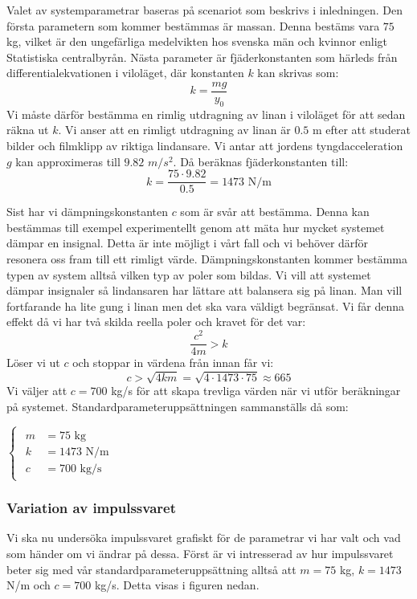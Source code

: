Valet av systemparametrar baseras på scenariot som beskrivs i inledningen. Den första parametern som kommer bestämmas är massan. Denna bestäms vara $75$ kg,  vilket är den ungefärliga medelvikten hos svenska män och kvinnor enligt Statistiska centralbyrån.
Nästa parameter är fjäderkonstanten som härleds från differentialekvationen i viloläget, där konstanten $k$ kan skrivas som:
\newline$$k=\frac{mg}{y_0}$$\newline
Vi måste därför bestämma en rimlig utdragning av linan i viloläget för att sedan räkna ut $k$. Vi anser att en rimligt utdragning av linan är $0.5$ m efter att studerat bilder och filmklipp av riktiga lindansare. Vi antar att jordens tyngdacceleration $g$ kan approximeras till $9.82$ $m/s^2$. Då beräknas fjäderkonstanten till:
\newline$$k=\frac{75 \cdot 9.82}{0.5}=1473 \text{ N/m}$$

Sist har vi dämpningskonstanten $c$ som är svår att bestämma. Denna kan bestämmas till exempel experimentellt genom att mäta hur mycket systemet dämpar en insignal. Detta är inte möjligt i vårt fall och vi behöver därför resonera oss fram till ett rimligt värde. Dämpningskonstanten kommer bestämma typen av system alltså vilken typ av poler som bildas. Vi vill att systemet dämpar insignaler så lindansaren har lättare att balansera sig på linan. Man vill fortfarande ha lite gung i linan men det ska vara väldigt begränsat. Vi får denna effekt då vi har två skilda reella poler och kravet för det var:
$$\frac{c^2}{4m} > k $$
Löser vi ut $c$ och stoppar in värdena från innan får vi:
$$c>\sqrt{4km}=\sqrt{4\cdot 1473\cdot 75} \approx 665$$
Vi väljer att $c=700$ kg/s för att skapa trevliga värden när vi utför beräkningar på systemet. Standardparameteruppsättningen sammanställs då som:
\begin{center}
$\begin{cases}
\begin{aligned}
m&=75 \text{ kg} \\
k&=1473 \text{ N/m} \\
c&=700 \text{ kg/s}
\end{aligned}
\end{cases}$
\end{center}

\newpage
\subsubsection{Variation av impulssvaret}
Vi ska nu undersöka impulssvaret grafiskt för de parametrar vi har valt och vad som händer om vi ändrar på dessa. Först är vi intresserad av hur impulssvaret beter sig med vår standardparameteruppsättning alltså att $m = 75$ kg, $k=1473$ N/m och $c=700$ kg/s. Detta visas i figuren nedan.

